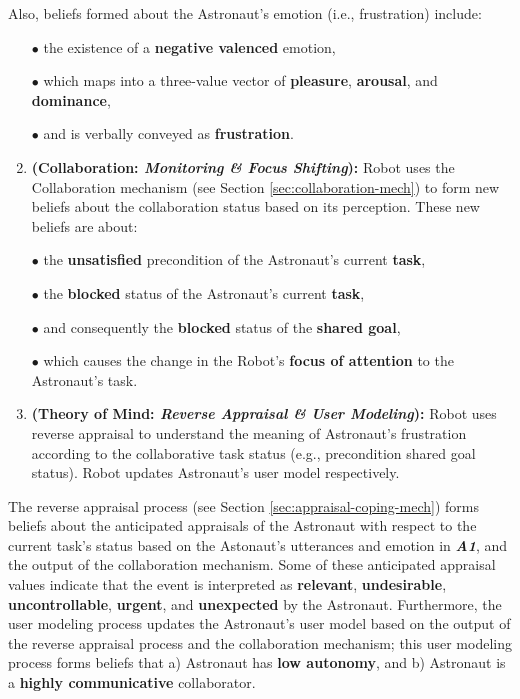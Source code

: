 \noindent Also, beliefs formed about the Astronaut's emotion (i.e., frustration)
include:

\begin{itemize}
  \item[$\bullet$] the existence of a \textbf{negative valenced} emotion,
  \item[$\bullet$] which maps into a three-value vector of \textbf{pleasure},
  \textbf{arousal}, and \textbf{dominance},
  \item[$\bullet$] and is verbally conveyed as \textbf{frustration}.\\
\end{itemize}

\begin{enumerate}
  \setcounter{enumi}{1}
  \item \textbf{(Collaboration: \textit{Monitoring \& Focus Shifting}):} Robot
  uses the Collaboration mechanism (see Section \ref{sec:collaboration-mech}) to
  form new beliefs about the collaboration status based on its perception. These
  new beliefs are about:
\end{enumerate}

\begin{itemize}
  \item[$\bullet$] the \textbf{unsatisfied} precondition of the Astronaut's
  current \textbf{task},
  \item[$\bullet$] the \textbf{blocked} status of the Astronaut's current
  \textbf{task},
  \item[$\bullet$] and consequently the \textbf{blocked} status of the
  \textbf{shared goal},
  \item[$\bullet$] which causes the change in the Robot's \textbf{focus of
  attention} to the Astronaut's task.
\end{itemize}

\begin{enumerate}
  \setcounter{enumi}{2}
  \item \textbf{(Theory of Mind: \textit{Reverse Appraisal \& User Modeling}):}
  Robot uses reverse appraisal to understand the meaning of Astronaut's
  frustration according to the collaborative task status (e.g., precondition
  shared goal status). Robot updates Astronaut's user model respectively.
\end{enumerate}

The reverse appraisal process (see Section \ref{sec:appraisal-coping-mech})
forms beliefs about the anticipated appraisals of the Astronaut with respect to
the current task's status based on the Astonaut's utterances and emotion in
\textit{\textbf{A1}}, and the output of the collaboration mechanism. Some of
these anticipated appraisal values indicate that the event is interpreted as
\textbf{relevant}, \textbf{undesirable}, \textbf{uncontrollable},
\textbf{urgent}, and \textbf{unexpected} by the Astronaut. Furthermore, the user
modeling process updates the Astronaut's user model based on the output of the
reverse appraisal process and the collaboration mechanism; this user modeling
process forms beliefs that a) Astronaut has \textbf{low autonomy}, and b)
Astronaut is a \textbf{highly communicative} collaborator.

